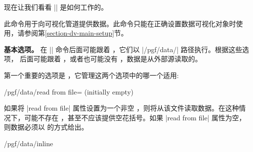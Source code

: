 
现在让我们看看 |\pgfdata| 是如何工作的。

\begin{command}{\pgfdata{}} %

    此命令用于向可视化管道提供数据。此命令只能在正确设置数据可视化对象时使用，请参阅第\ref{section-dv-main-setup}节。

    \medskip

    \textbf{基本选项。} 在 |\pgfdata| 命令后面可能跟着 ，它们以 |/pgf/data/| 路径执行。根据这些选项， 后面可能跟着 ，或者也可能没有 ，数据是从外部源读取的。


    第一个重要的选项是 ，它管理这两个选项中的哪一个适用:
    \begin{key}{/pgf/data/read from file= (initially \normalfont empty)} %

        如果将 |read from file| 属性设置为一个非空 ，则将从该文件读取数据。在这种情况下，可能不存在 ，甚至不应该提供空花括号。如果 |read from file| 属性为空，则数据必须以  的方式给出。
\begin{codeexample}
\pgfdata[format=table, read from file=file1.csv]
\pgfdata[format=table, read from file=file2.csv]
\end{codeexample}
\begin{codeexample}
\end{codeexample}
    \end{key}
    \begin{key}{/pgf/data/inline}


\end{key}
\end{command}

